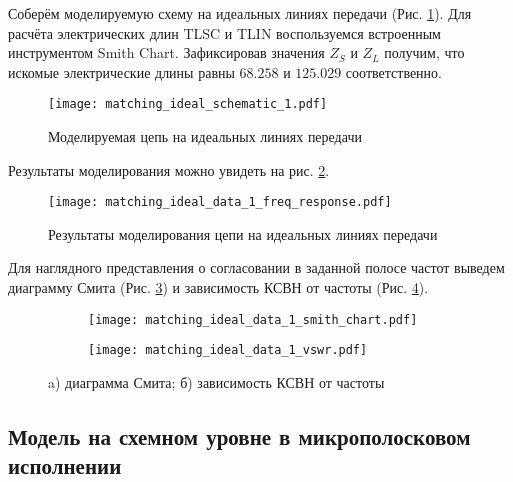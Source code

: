 Соберём моделируемую схему на идеальных линиях передачи (Рис. \ref{fig:matching_ideal_schematic_1}). Для расчёта электрических длин TLSC и TLIN воспользуемся встроенным инструментом Smith Chart. Зафиксировав значения $Z_S$ и $Z_L$ получим, что искомые электрические длины равны $68.258$ и $125.029$ соответственно.

\begin{figure}[!ht]
    \centering
    \texttt{[image: matching\_ideal\_schematic\_1.pdf]}
    \caption{Моделируемая цепь на идеальных линиях передачи}
    \label{fig:matching_ideal_schematic_1}
\end{figure}

Результаты моделирования можно увидеть на рис. \ref{fig:matching_ideal_data_1_freq_response}.

\begin{figure}[!ht]
    \centering
    \texttt{[image: matching\_ideal\_data\_1\_freq\_response.pdf]}
    \caption{Результаты моделирования цепи на идеальных линиях передачи}
    \label{fig:matching_ideal_data_1_freq_response}
\end{figure}

Для наглядного представления о согласовании в заданной полосе частот выведем диаграмму Смита (Рис. \ref{fig:matching_ideal_data_1_smith_chart}) и зависимость КСВН от частоты (Рис. \ref{fig:matching_ideal_data_1_vswr}).

\begin{figure}[!ht]
    \begin{subfigure}[b]{0.45\textwidth}
        \centering
        \texttt{[image: matching\_ideal\_data\_1\_smith\_chart.pdf]}
        \caption{}
        \label{fig:matching_ideal_data_1_smith_chart}
    \end{subfigure}
    \hfill
    \begin{subfigure}[b]{0.45\textwidth}
        \centering
        \texttt{[image: matching\_ideal\_data\_1\_vswr.pdf]}
        \caption{}
        \label{fig:matching_ideal_data_1_vswr}
    \end{subfigure}
    \caption{
        a) диаграмма Смита;
        б) зависимость КСВН от частоты
    }
    \label{fig:matching_ideal_data_display_1}
\end{figure}

\subsection{Модель на схемном уровне в микрополосковом исполнении}

